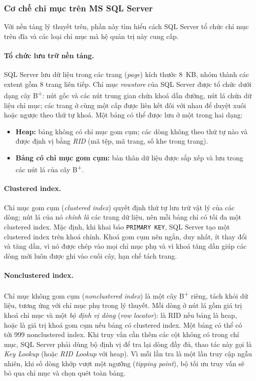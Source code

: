\subsubsection{Cơ chế chỉ mục trên MS SQL Server}
\label{subsubsec:indexing-mssql}

Với nền tảng lý thuyết trên, phần này tìm hiểu cách SQL Server tổ chức chỉ mục trên đĩa và các loại chỉ mục mà hệ quản trị này cung cấp.

\paragraph{Tổ chức lưu trữ nền tảng.} SQL Server lưu dữ liệu trong các trang (\emph{page}) kích thước 8~KB, nhóm thành các extent gồm 8 trang liên tiếp. Chỉ mục \emph{rowstore} của SQL Server được tổ chức dưới dạng cây B\textsuperscript{+}: nút gốc và các nút trung gian chứa khoá dẫn đường, nút lá chứa dữ liệu chỉ mục; các trang ở cùng một cấp được liên kết đôi với nhau để duyệt xuôi hoặc ngược theo thứ tự khoá. Một bảng có thể được lưu ở một trong hai dạng:

\begin{itemize}
    \item \textbf{Heap:} bảng không có chỉ mục gom cụm; các dòng không theo thứ tự nào và được định vị bằng \emph{RID} (mã tệp, mã trang, số khe trong trang).
    \item \textbf{Bảng có chỉ mục gom cụm:} bản thân dữ liệu được sắp xếp và lưu trong các nút lá của cây B\textsuperscript{+}.
\end{itemize}

\paragraph{Clustered index.} Chỉ mục gom cụm (\emph{clustered index}) quyết định thứ tự lưu trữ vật lý của các dòng; nút lá của nó \emph{chính là} các trang dữ liệu, nên mỗi bảng chỉ có tối đa một clustered index. Mặc định, khi khai báo \texttt{PRIMARY KEY}, SQL Server tạo một clustered index trên khoá chính. Khoá gom cụm nên ngắn, duy nhất, ít thay đổi và tăng dần, vì nó được chép vào mọi chỉ mục phụ và vì khoá tăng dần giúp các dòng mới luôn được ghi vào cuối cây, hạn chế tách trang.

\paragraph{Nonclustered index.} Chỉ mục không gom cụm (\emph{nonclustered index}) là một cây B\textsuperscript{+} riêng, tách khỏi dữ liệu, tương ứng với chỉ mục phụ trong lý thuyết. Mỗi dòng ở nút lá gồm giá trị khoá chỉ mục và một \emph{bộ định vị dòng} (\emph{row locator}): là RID nếu bảng là heap, hoặc là giá trị khoá gom cụm nếu bảng có clustered index. Một bảng có thể có tới 999 nonclustered index. Khi truy vấn cần thêm các cột không có trong chỉ mục, SQL Server phải dùng bộ định vị để tra lại dòng đầy đủ, thao tác này gọi là \emph{Key Lookup} (hoặc \emph{RID Lookup} với heap). Vì mỗi lần tra là một lần truy cập ngẫu nhiên, khi số dòng khớp vượt một ngưỡng (\emph{tipping point}), bộ tối ưu truy vấn sẽ bỏ qua chỉ mục và chọn quét toàn bảng.

